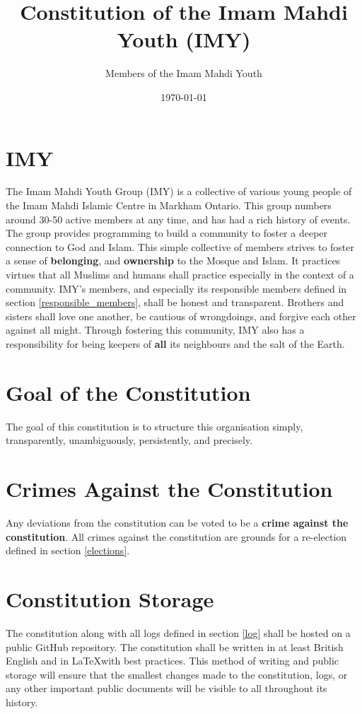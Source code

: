 \documentclass{article}
\begin{document}
\linenumbers



\title{Constitution of the Imam Mahdi Youth (IMY)}
\author{Members of the Imam Mahdi Youth}
\date{\today}
\maketitle

\section{IMY}
The Imam Mahdi Youth Group (IMY) is a collective of various young people of the Imam Mahdi Islamic Centre in Markham Ontario.
This group numbers around 30-50 active members at any time, and has had a rich history of events.
The group provides programming to build a community to foster a deeper connection to God and Islam.
This simple collective of members strives to foster a sense of \textbf{belonging}, and \textbf{ownership} to the Mosque and Islam.
It practices virtues that all Muslims and humans shall practice especially in the context of a community.
IMY's members, and especially its responsible members defined in section \ref{responsible_members}, shall be honest and transparent.
Brothers and sisters shall love one another, be cautious of wrongdoings, and forgive each other against all might.
Through fostering this community, IMY also has a responsibility for being keepers of \textbf{all} its neighbours and the salt of the Earth.

\section{Goal of the Constitution}
\label{constituition_goal}
The goal of this constitution is to structure this organisation
simply,
transparently,
unambiguously,
persistently,
and precisely.

\section{Crimes Against the Constitution}
\label{crimes}
Any deviations from the constitution can be voted to be a
\textbf{crime against the constitution}.
All crimes against the constitution are grounds for a re-election defined in section \ref{elections}.

\section{Constitution Storage}
\label{storage}
The constitution along with all logs defined in section \ref{log} shall be hosted on a public GitHub repository.
The constitution shall be written in at least British English and in \LaTeX with best practices.
This method of writing and public storage will ensure that the smallest changes made to the constitution, logs, or any other important public documents will be visible to all throughout its history.
\end{document}
